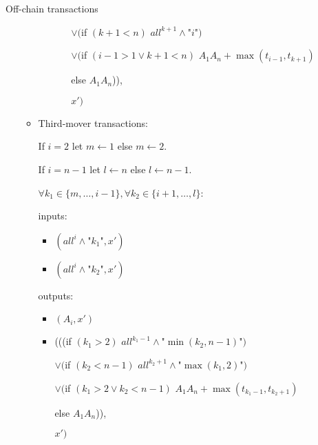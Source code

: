 \begin{notitlebox}{Off-chain transactions}
\begin{itemize}
\begin{itemize}
\begin{itemize}
\begin{itemize}
          $\vee ($if $(k+1 < n)$ $\mathit{all}^{k+1} \wedge \texttt{"}i\texttt{"})$

          $\vee ($if $(i-1 > 1 \vee k+1 < n)$ $A_1 A_n+\max{(t_{i-1}, t_{k+1})}$

          \:\:\: else $A_1 A_n$)),

          $x')$
        \end{itemize}
      \end{itemize}
      \item Third-mover transactions:

      If $i = 2$ let $m \gets 1$ else $m \gets 2$.

      If $i = n-1$ let $l \gets n$ else $l \gets n-1$.

      $\forall k_1 \in \{m, \dots, i-1\}, \forall k_2 \in \{i+1, \dots, l\}$:

      inputs:
      \begin{itemize}
        \item $(\mathit{all}^i \wedge \texttt{"}k_1\texttt{"}, x')$
        \item $(\mathit{all}^i \wedge \texttt{"}k_2\texttt{"}, x')$
      \end{itemize}
      outputs:
      \begin{itemize}
        \item $(A_i, x')$
        \item (((if $(k_1 > 2)$ $\mathit{all}^{k_1-1} \wedge
        \texttt{"}\min{(k_2, n-1)}\texttt{"})$

        $\vee ($if $(k_2 < n - 1)$ $\mathit{all}^{k_2+1} \wedge
        \texttt{"}\max{(k_1, 2)}\texttt{"})$

        $\vee ($if $(k_1 > 2 \vee k_2 < n-1)$ $A_1 A_n+\max{(t_{k_1-1},
        t_{k_2+1})}$

        \:\:\: else $A_1 A_n$)),

        $x')$
      \end{itemize}
    \end{itemize}
  \end{itemize}
\end{notitlebox}
